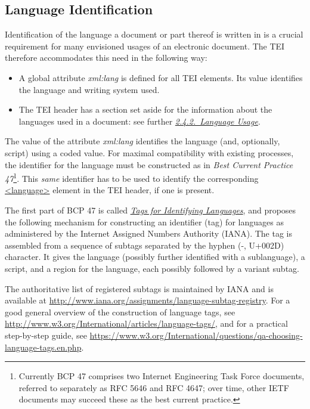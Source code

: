 \subsection[{Language Identification}]{Language Identification}\label{CHSH}\par
Identification of the language a document or part thereof is written in is a crucial requirement for many envisioned usages of an electronic document. The TEI therefore accommodates this need in the following way:\begin{itemize}
\item A global attribute {\itshape xml:lang} is defined for all TEI elements. Its value identifies the language and writing system used.
\item The TEI header has a section set aside for the information about the languages used in a document: see further \textit{\hyperref[HD41]{2.4.2.\ Language Usage}}.
\end{itemize} \par
The value of the attribute {\itshape xml:lang} identifies the language (and, optionally, script) using a coded value. For maximal compatibility with existing processes, the identifier for the language must be constructed as in \textit{Best Current Practice 47}\footnote{Currently BCP 47 comprises two Internet Engineering Task Force documents, referred to separately as RFC 5646 and RFC 4647; over time, other IETF documents may succeed these as the best current practice.}. This \textit{same} identifier has to be used to identify the corresponding \hyperref[TEI.language]{<language>} element in the TEI header, if one is present.\par
The first part of BCP 47 is called \hyperref[CH-BIBL-4]{\textit{Tags for Identifying Languages}}, and proposes the following mechanism for constructing an identifier (tag) for languages as administered by the Internet Assigned Numbers Authority (IANA). The tag is assembled from a sequence of subtags separated by the hyphen (-, U+002D) character. It gives the language (possibly further identified with a sublanguage), a script, and a region for the language, each possibly followed by a variant subtag.\par
The authoritative list of registered subtags is maintained by IANA and is available at \url{http://www.iana.org/assignments/language-subtag-registry}. For a good general overview of the construction of language tags, see \url{http://www.w3.org/International/articles/language-tags/}, and for a practical step-by-step guide, see \url{https://www.w3.org/International/questions/qa-choosing-language-tags.en.php}.\par
